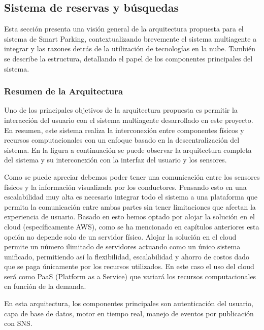 \clearpage

\subsection{Sistema de reservas y búsquedas}
Esta sección presenta una visión general de la arquitectura propuesta para el sistema de Smart Parking, contextualizando brevemente el sistema multiagente a integrar y las razones detrás de la utilización de tecnologías en la nube. También se describe la estructura, detallando el papel de los componentes principales del sistema.

\subsubsection{Resumen de la Arquitectura}

Uno de los principales objetivos de la arquitectura propuesta es permitir la interacción del usuario con el sistema multiagente desarrollado en este proyecto. En resumen, este sistema realiza la interconexión entre componentes físicos y recursos computacionales con un enfoque basado en la descentralización del sistema. En la figura a continuación se puede observar la arquitectura completa del sistema y su interconexión con la interfaz del usuario y los sensores.


Como se puede apreciar debemos poder tener una comunicación entre los sensores físicos y la información visualizada por los conductores. Pensando esto en una escalabilidad muy alta es necesario integrar todo el sistema a una plataforma que permita la comunicación entre ambas partes sin tener limitaciones que afectan la experiencia de usuario. Basado en esto hemos optado por alojar la solución en el cloud (específicamente AWS), como se ha mencionado en capítulos anteriores esta opción no depende solo de un servidor físico. Alojar la solución en el cloud permite un número ilimitado de servidores actuando como un único sistema unificado, permitiendo así la flexibilidad, escalabilidad y ahorro de costos dado que se paga únicamente por los recursos utilizados. En este caso el uso del cloud será como PaaS (Platform as a Service) que variará los recursos computacionales en función de la demanda.

En esta arquitectura, los componentes principales son autenticación del usuario, capa de base de datos, motor en tiempo real, manejo de eventos por publicación con SNS.

